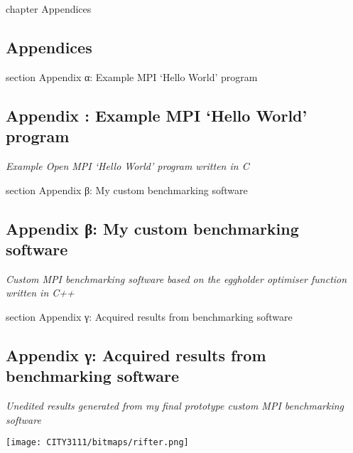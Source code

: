 \cleardoublepage
{}
{}
    {chapter}
    {Appendices}
\begin{landscape}
    \chapter*{Appendices}
        {section}
        {Appendix α: Example MPI `Hello World' program}
    \section*{Appendix \textalpha: Example MPI `Hello World' program}
    
    \begin{center}
        \emph{Example Open MPI `Hello World' program written in C\cite{barrett_et_al_2006}}
    \end{center}
    \vfill\break
    
        {section}
        {Appendix β: My custom benchmarking software}
    \section*{Appendix β: My custom benchmarking software}
    
    \begin{center}
        \emph{Custom MPI benchmarking software based on the eggholder optimiser function written in C++}
    \end{center}
    \vfill\break
    
        {section}
        {Appendix γ: Acquired results from benchmarking software}
    \section*{Appendix γ: Acquired results from benchmarking software}
    
    \begin{center}
        \emph{Unedited results generated from my final prototype custom MPI benchmarking software}
    \end{center}
    \vfill\break
\end{landscape}
    
    \cleardoublepage
    \pagestyle{plain}
    \begin{center}
        \texttt{[image: CITY3111/bitmaps/rifter.png]}
    \end{center}
